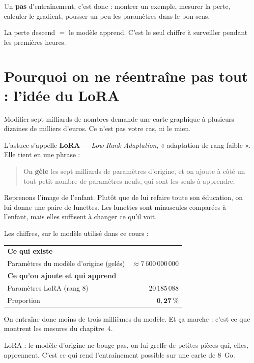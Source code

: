 Un \textbf{pas} d'entraînement, c'est donc : montrer un exemple, mesurer la
perte, calculer le gradient, pousser un peu les paramètres dans le bon sens.

\begin{nkretenir}
La perte descend $=$ le modèle apprend. C'est le seul chiffre à surveiller
pendant les premières heures.
\end{nkretenir}

\section{Pourquoi on ne réentraîne pas tout : l'idée du LoRA}

Modifier sept milliards de nombres demande une carte graphique à plusieurs
dizaines de milliers d'euros. Ce n'est pas votre cas, ni le mien.

L'astuce s'appelle \textbf{LoRA} — \emph{Low-Rank Adaptation}, « adaptation de
rang faible ». Elle tient en une phrase :

\begin{quote}
On \textbf{gèle} les sept milliards de paramètres d'origine, et on ajoute à côté
un tout petit nombre de paramètres neufs, qui sont les seuls à apprendre.
\end{quote}

Reprenons l'image de l'enfant. Plutôt que de lui refaire toute son éducation, on
lui donne une paire de lunettes. Les lunettes sont minuscules comparées à
l'enfant, mais elles suffisent à changer ce qu'il voit.

Les chiffres, sur le modèle utilisé dans ce cours :

\begin{center}
\begin{tabular}{lr}
\toprule
\textbf{Ce qui existe} & \\
Paramètres du modèle d'origine (gelés) & $\approx 7\,600\,000\,000$ \\
\midrule
\textbf{Ce qu'on ajoute et qui apprend} & \\
Paramètres LoRA (rang 8) & $20\,185\,088$ \\
Proportion & $\mathbf{0{,}27~\%}$ \\
\bottomrule
\end{tabular}
\end{center}

On entraîne donc moins de trois millièmes du modèle. Et ça marche : c'est ce que
montrent les mesures du chapitre~4.

\begin{nkretenir}
LoRA : le modèle d'origine ne bouge pas, on lui greffe de petites pièces qui,
elles, apprennent. C'est ce qui rend l'entraînement possible sur une carte de
8~Go.
\end{nkretenir}

